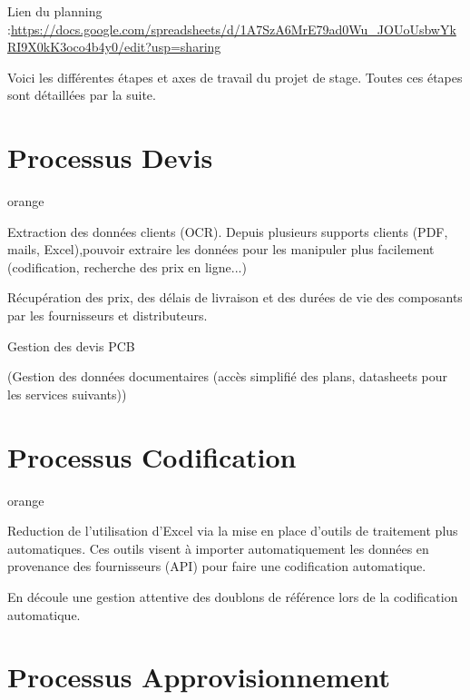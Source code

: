{Lien du planning  :\url{https://docs.google.com/spreadsheets/d/1A7SzA6MrE79ad0Wu_JOUoUsbwYkRI9X0kK3oco4b4y0/edit?usp=sharing}

Voici les différentes étapes et axes de travail du projet de stage. Toutes ces étapes sont détaillées par la suite.

\section{Processus Devis}

\begin{items}{orange}{\Bullet}

\item Extraction des données clients (OCR). 
Depuis plusieurs supports clients (PDF, mails, Excel),pouvoir extraire les données pour les manipuler plus facilement (codification, recherche des prix en ligne...)

\item Récupération des prix, des délais de livraison et des durées de vie des composants par les fournisseurs et distributeurs.

\item Gestion des devis PCB

\item (Gestion des données documentaires (accès simplifié des plans, datasheets pour les services suivants))

\end{items}


\section{Processus Codification}

\begin{items}{orange}{\Bullet}

\item Reduction de l’utilisation d’Excel via la mise en place d’outils de traitement plus automatiques. Ces outils visent à importer automatiquement les données en provenance des fournisseurs (API) pour faire une codification automatique.

\item En découle une gestion attentive des doublons de référence lors de la codification automatique.

\end{items}

\section{Processus Approvisionnement}

}
